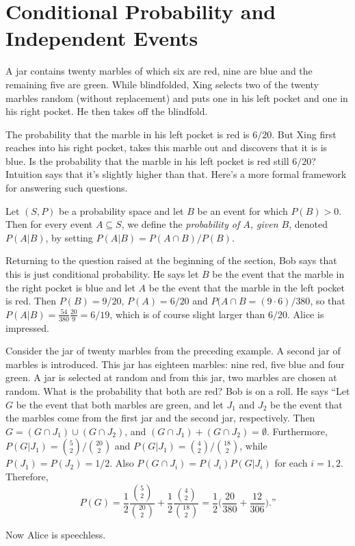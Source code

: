 \section{Conditional Probability and Independent Events}

A jar contains twenty marbles of which six are red, nine are blue
and the remaining five are green.  While blindfolded, Xing selects two of the twenty 
marbles random (without replacement) and puts one in his left pocket and
one in his right pocket.  He then takes off the blindfold.

The probability that the marble in his left pocket is red is $6/20$.
But Xing first reaches into his right pocket, takes this marble out and
discovers that it is is blue.  Is the probability that the marble in
his left pocket is red still $6/20$?  Intuition says that it's slightly
higher than that.  Here's a more formal framework for answering such
questions.

Let $(S,P)$ be a probability space and let $B$ be an event for
which $P(B)>0$.  Then for every event $A\subseteq S$, we define
the \textit{probability of $A$, given $B$}, denoted $P(A|B)$, by setting
$P(A|B)=P(A\cap B)/P(B)$.  

\begin{discussion}
Returning to the question raised at the beginning of the section, Bob says that this
is just conditional probability. He says let $B$ be the event
that the  marble in the right pocket is blue and let $A$ be the event that the 
marble  in the left pocket is  red.  Then $P(B)=9/20$, $P(A) = 6/20$ and 
$P(A\cap B=(9\cdot6)/380$,
so that $P(A|B)= \frac{54}{380}\frac{20}{9}=6/19$, which is of course
slight larger than $6/20$.   Alice is impressed.
\end{discussion}

\begin{example}\label{exa:twojars}
Consider the jar of twenty marbles from the preceding example.
A second jar of marbles is introduced.  This jar has eighteen marbles:
nine red, five blue and four green.  A jar is selected at
random and from this jar, two marbles are chosen at random.  What is the
probability that both are red?  Bob is on a roll.  He says ``Let $G$ be the
event that both marbles are green, and let $J_1$ and $J_2$ be the event
that the marbles come from the first jar and the second jar, respectively.
Then $G= (G\cap J_1)\cup (G\cap J_2)$, and $(G\cap J_1)+(G\cap J_2)=\emptyset$.
Furthermore, $P(G|J_1)=\binom{5}{2}/\binom{20}{2}$ and
$P(G|J_1)=\binom{4}{2}/\binom{18}{2}$, while $P(J_1)=P(J_2)=1/2$.
Also $P(G\cap J_i)=P(J_i)P(G|J_i)$ for each $i=1,2$.  Therefore,
\[
P(G)=\frac{1}{2}\frac{\binom{5}{2}}{\binom{20}{2}}+ 
     \frac{1}{2}\frac{\binom{4}{2}}{\binom{18}{2}}=\frac{1}{2}\bigl(\frac{20}{380}+
     \frac{12}{306}\bigr).\text{''}
\]

Now Alice is speechless.
\end{example}

